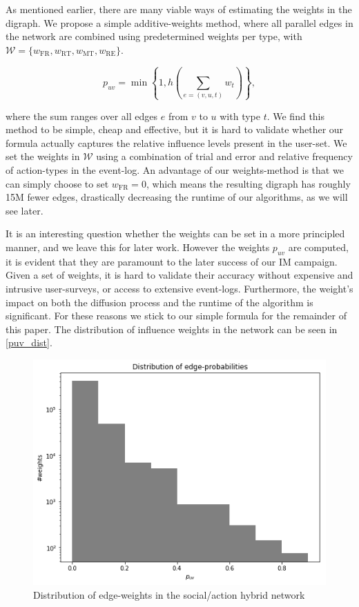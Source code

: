 \documentclass[sigconf]{acmart}
\begin{document}
As mentioned earlier, there are many viable ways of estimating the weights in the digraph. We propose a simple additive-weights method, where all parallel edges in the network are combined using predetermined weights per type, with \hspace{0.02cm}$\mathcal{W} = \{w_{\text{FR}}, w_{\text{RT}}, w_{\text{MT}}, w_{\text{RE}}\}$.

\begin{equation}
p_{uv} = \min \left\{1, 
h\left(\sum_{e = (v, u, t)}w_t\right) \right\},
\end{equation}

where the sum ranges over all edges $e$ from $v$ to $u$ with type $t$. We find this method to be simple, cheap and effective, but it is hard to validate whether our formula actually captures the relative influence levels present in the user-set. We set the weights in $\mathcal{W}$ using a combination of trial and error and relative frequency of action-types in the event-log. An advantage of our weights-method is that we can simply choose to set $w_{\text{FR}} = 0$, which means the resulting digraph has roughly 15M fewer edges, drastically decreasing the runtime of our algorithms, as we will see later. 

It is an interesting question whether the weights can be set in a more principled manner, and we leave this for later work. However the weights $p_{uv}$ are computed, it is evident that they are paramount to the later success of our IM campaign. Given a set of weights, it is hard to validate their accuracy without expensive and intrusive user-surveys, or access to extensive event-logs. Furthermore, the weight's impact on both the diffusion process and the runtime of the algorithm is significant. For these reasons we stick to our simple formula for the remainder of this paper. The distribution of influence weights in the network can be seen in \autoref{puv_dist}. 

\begin{figure}[htbp]
\begin{center}
\includegraphics[width=\linewidth]{Figures/puv_dist.png}
\caption{Distribution of edge-weights in the social/action hybrid network}
\label{puv_dist}
\end{center}
\end{figure}
\end{document}
